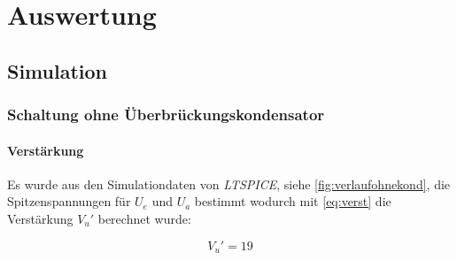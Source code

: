 \documentclass[12pt,english,ngerman]{scrartcl}
\begin{document}
\section{Auswertung}\label{sec:Auswertung}

\subsection{Simulation}

\subsubsection{Schaltung ohne Überbrückungskondensator}


\paragraph{Verstärkung}

Es wurde aus den Simulationdaten von \textit{LTSPICE}, siehe
\autoref{fig:verlaufohnekond}, die Spitzenspannungen für $U_e$ und $U_a$
bestimmt wodurch mit \autoref{eq:verst} die Verstärkung $V_{u}'$ berechnet wurde:

\begin{equation}
  V_{u}' = 19
  \label{eq:sim_verst_ohne}
\end{equation}



\end{document}
